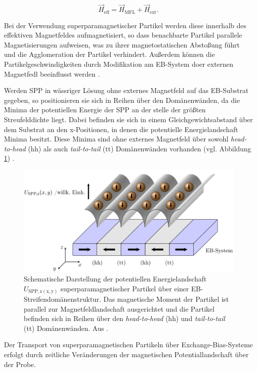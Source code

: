 \documentclass[page,pdftex,12pt,a4paper,twoside,openright]{scrbook}
\begin{document}
\begin{equation}
\vec{H}_\mathrm{eff} = \vec{H}_\mathrm{MFL} + \vec{H}_\mathrm{ext}.
\end{equation}

Bei der Verwendung superparamagnetischer Partikel werden diese innerhalb des effektiven Magnetfeldes aufmagnetisiert, so dass benachbarte Partikel parallele Magnetisierungen aufweisen, was zu ihrer magnetostatischen Abstoßung führt und die Agglomeration der Partikel verhindert. Außerdem können die Partikelgeschwindigkeiten durch Modifikation am EB-System doer externen Magnetfedl beeinflusst werden \cite{holzinger_directed_2015}.

Werden SPP in wässriger Lösung ohne externes Magnetfeld auf das EB-Substrat gegeben, so positionieren sie sich in Reihen über den Domänenwänden, da die Minima der potentiellen Energie der SPP an der stelle der größten Streufelddichte liegt. Dabei befinden sie sich in einem Gleichgewichtsabstand über dem Substrat an den x-Positionen, in denen die potentielle Energielandschaft Minima besitzt. Diese Minima sind ohne externes Magnetfeld über sowohl \emph{head-to-head} (hh) als auch \emph{tail-to-tail} (tt) Domänenwänden vorhanden (vgl. Abbildung \ref{fig-mfl}) \cite{holzinger_directed_2015}.

\begin{figure}[h]
\centering
\includegraphics[width=\textwidth]{img/mfl.png}
\caption{\label{fig-mfl}
Schematische Darstellung der potentiellen Energielandschaft \(U_\mathrm{SPP,z(x,y)}\) superparamagnetischer Partikel über einer EB-Streifendomänenstruktur. Das magnetische Moment der Partikel ist parallel zur Magnetfeldlandschaft ausgerichtet und die Partikel befinden sich in Reihen über den \emph{head-to-head} (hh) und \emph{tail-to-tail} (tt) Domänenwänden. Aus \cite{holzinger_transport_2015}.}
\end{figure}

Der Transport von superparamagnetischen Partikeln über Exchange-Bias-Systeme erfolgt durch zeitliche Veränderungen der magnetischen Potentiallandschaft über der Probe. 
\end{document}
